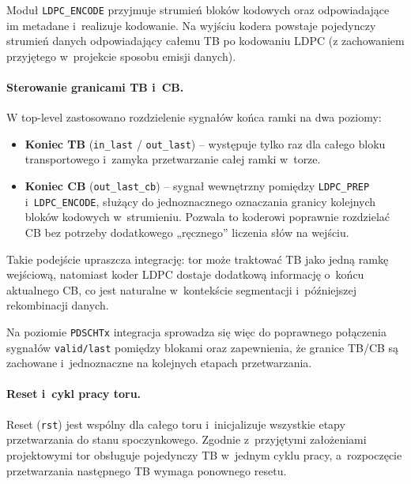 Moduł \texttt{LDPC\_ENCODE} przyjmuje strumień bloków kodowych oraz odpowiadające im metadane i~realizuje kodowanie. Na wyjściu kodera powstaje pojedynczy strumień danych odpowiadający całemu TB po kodowaniu LDPC (z zachowaniem przyjętego w~projekcie sposobu emisji danych).

\paragraph{Sterowanie granicami TB i~CB.}
W top-level zastosowano rozdzielenie sygnałów końca ramki na dwa poziomy:
\begin{itemize}
  \item \textbf{Koniec TB} (\texttt{in\_last} / \texttt{out\_last}) -- występuje tylko raz dla całego bloku transportowego i~zamyka przetwarzanie całej ramki w~torze.
  \item \textbf{Koniec CB} (\texttt{out\_last\_cb}) -- sygnał wewnętrzny pomiędzy \texttt{LDPC\_PREP} i~\texttt{LDPC\_ENCODE}, służący do jednoznacznego oznaczania granicy kolejnych bloków kodowych w~strumieniu. Pozwala to koderowi poprawnie rozdzielać CB bez potrzeby dodatkowego „ręcznego” liczenia słów na wejściu.
\end{itemize}

Takie podejście upraszcza integrację: tor może traktować TB jako jedną ramkę wejściową, natomiast koder LDPC dostaje dodatkową informację o~końcu aktualnego CB, co jest naturalne w~kontekście segmentacji i~późniejszej rekombinacji danych.

Na poziomie \texttt{PDSCHTx} integracja sprowadza się więc do poprawnego połączenia sygnałów \texttt{valid/last} pomiędzy blokami oraz zapewnienia, że granice TB/CB są zachowane i~jednoznaczne na kolejnych etapach przetwarzania.

\paragraph{Reset i~cykl pracy toru.}
Reset (\texttt{rst}) jest wspólny dla całego toru i~inicjalizuje wszystkie etapy przetwarzania do stanu spoczynkowego. Zgodnie z~przyjętymi założeniami projektowymi tor obsługuje pojedynczy TB w~jednym cyklu pracy, a~rozpoczęcie przetwarzania następnego TB wymaga ponownego resetu.





















